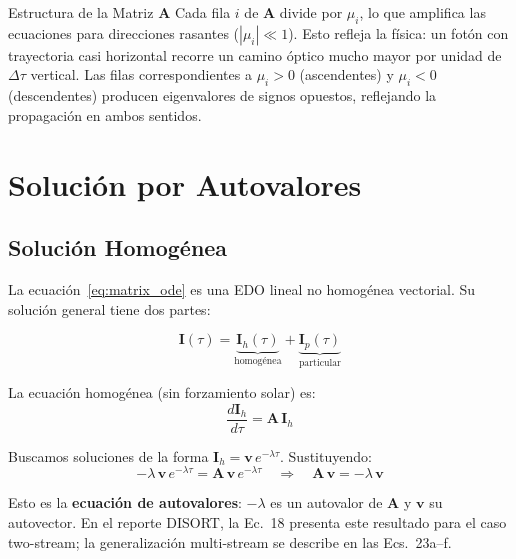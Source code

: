 \documentclass[a4paper,11pt]{article}
\begin{document}
\begin{physics}{Estructura de la Matriz $\mathbf{A}$}
Cada fila $i$ de $\mathbf{A}$ divide por $\mu_i$, lo que amplifica las
ecuaciones para direcciones rasantes ($|\mu_i|\ll 1$).  Esto refleja la
f\'isica: un fot\'on con trayectoria casi horizontal recorre un camino
\'optico mucho mayor por unidad de $\Delta\tau$ vertical.  Las filas
correspondientes a $\mu_i > 0$ (ascendentes) y $\mu_i < 0$ (descendentes)
producen eigenvalores de signos opuestos, reflejando la propagaci\'on
en ambos sentidos.
\end{physics}


\section{Soluci\'on por Autovalores}

\subsection{Soluci\'on Homog\'enea}

La ecuaci\'on~\eqref{eq:matrix_ode} es una EDO lineal no homog\'enea vectorial.
Su soluci\'on general tiene dos partes:

\begin{equation}
    \mathbf{I}(\tau) = \underbrace{\mathbf{I}_h(\tau)}_{\text{homog\'enea}}
    + \underbrace{\mathbf{I}_p(\tau)}_{\text{particular}}
\end{equation}

La ecuaci\'on homog\'enea (sin forzamiento solar) es:
\begin{equation}
    \frac{d\mathbf{I}_h}{d\tau} = \mathbf{A}\,\mathbf{I}_h
\end{equation}

Buscamos soluciones de la forma $\mathbf{I}_h = \mathbf{v}\,e^{-\lambda\tau}$.
Sustituyendo:
\begin{equation}
    -\lambda\,\mathbf{v}\,e^{-\lambda\tau} = \mathbf{A}\,\mathbf{v}\,e^{-\lambda\tau}
    \quad\Longrightarrow\quad
    \mathbf{A}\,\mathbf{v} = -\lambda\,\mathbf{v}
\end{equation}

Esto es la \textbf{ecuaci\'on de autovalores}: $-\lambda$ es un autovalor de
$\mathbf{A}$ y $\mathbf{v}$ su autovector.  En el reporte DISORT, la Ec.~18
presenta este resultado para el caso two-stream; la generalizaci\'on multi-stream
se describe en las Ecs.~23a--f.
\end{document}
